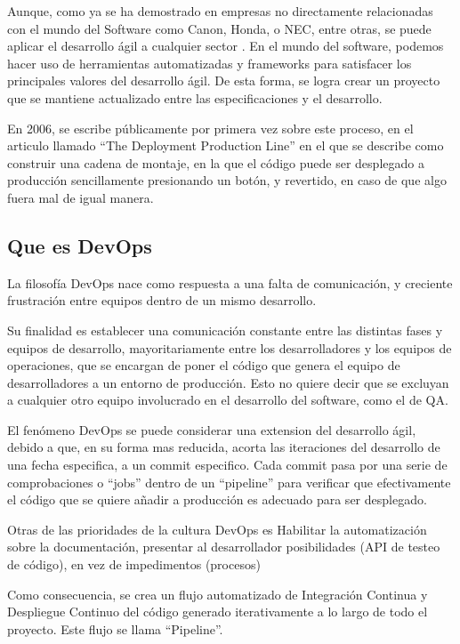 \documentclass[12pt]{report} %
\begin{document}
Aunque, como ya se ha demostrado en empresas no directamente relacionadas con el mundo del Software como Canon, Honda, o NEC, entre otras, se puede aplicar el desarrollo ágil a cualquier sector \cite{Hirotaka1986}.
En el mundo del software, podemos hacer uso de herramientas automatizadas y frameworks para satisfacer los principales valores del desarrollo ágil.
De esta forma, se logra crear un proyecto que se mantiene actualizado entre las especificaciones y el desarrollo.

En 2006, se escribe públicamente por primera vez sobre este proceso, en el articulo llamado ``The Deployment Production Line'' en el que se describe como construir una cadena de montaje, en la que el código puede ser desplegado a producción sencillamente presionando un botón, y revertido, en caso de que algo fuera mal de igual manera. \cite{10.1109/AGILE.2006.53}

\subsection{Que es DevOps}


La filosofía DevOps nace como respuesta a una falta de comunicación, y creciente frustración entre equipos dentro de un mismo desarrollo.

Su finalidad es establecer una comunicación constante entre las distintas fases y equipos de desarrollo, mayoritariamente entre los desarrolladores y los equipos de operaciones, que se encargan de poner el código que genera el equipo de desarrolladores a un entorno de producción. Esto no quiere decir que se excluyan a cualquier otro equipo involucrado en el desarrollo del software, como el de QA.

El fenómeno DevOps se puede considerar una extension del desarrollo ágil, debido a que, en su forma mas reducida, acorta las iteraciones del desarrollo de una fecha especifica, a un commit especifico. \cite{dobra2018}
Cada commit pasa por una serie de comprobaciones o ``jobs'' dentro de un ``pipeline'' para verificar que efectivamente el código que se quiere añadir a producción es adecuado para ser desplegado.

Otras de las prioridades de la cultura DevOps es Habilitar la automatización sobre la documentación, presentar al desarrollador posibilidades (API de testeo de código), en vez de impedimentos (procesos)

Como consecuencia, se crea un flujo automatizado de Integración Continua y Despliegue Continuo del código generado iterativamente a lo largo de todo el proyecto. Este flujo se llama ``Pipeline''.
\end{document}
